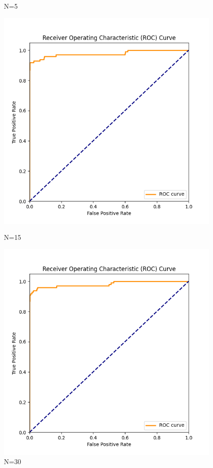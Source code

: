 \documentclass[8pt]{article}
\begin{document}
\begin{figure}[H]
\begin{minipage}{0.24\textwidth}
        \caption{N=5}
        \label{fig:roc_curve_N_5_K_7}
    \end{minipage}
    \begin{minipage}{0.24\textwidth}
        \centering
        \includegraphics[width=\textwidth]{../Prob1/out/rand_seed_14/task3/roc_curve_N_15_K_7.png}
        \caption{N=15}
        \label{fig:roc_curve_N_15_K_7}
    \end{minipage}
    \begin{minipage}{0.24\textwidth}
        \centering
        \includegraphics[width=\textwidth]{../Prob1/out/rand_seed_14/task3/roc_curve_N_30_K_7.png}
        \caption{N=30}
        \label{fig:roc_curve_N_30_K_7}
    \end{minipage}
\end{figure}
\end{document}

